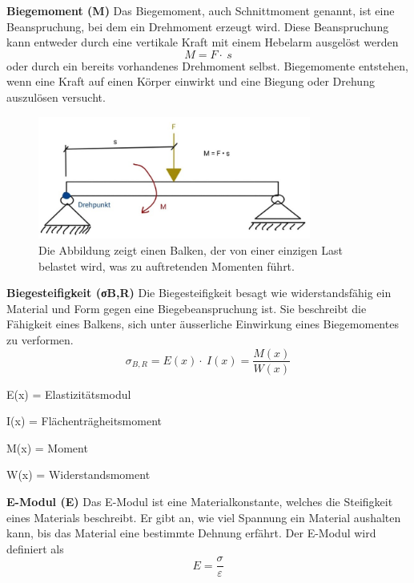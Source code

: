 \textbf{Biegemoment (M)}
Das Biegemoment, auch Schnittmoment genannt, ist eine Beanspruchung, bei dem ein Drehmoment erzeugt wird.
Diese Beanspruchung kann entweder durch eine vertikale Kraft mit einem Hebelarm ausgelöst werden
\begin{equation}
	M=
	F\cdot\ s
\end{equation}
oder durch ein bereits vorhandenes Drehmoment selbst.
Biegemomente entstehen, wenn eine Kraft auf einen Körper einwirkt und eine Biegung oder Drehung auszulösen versucht.
\begin{figure} [h]
	\centering
	\includegraphics[width=0.8\textwidth]{papers/balken/images/teil1/Biegemoment.jpg}
	\caption{Die Abbildung zeigt einen Balken, der von einer einzigen Last belastet wird, was zu auftretenden Momenten führt.}
	\label{fig:Die Abbildung zeigt einen Balken, der von einer einzigen Last belastet wird, was zu auftretenden Momenten führt.}
\end{figure}

\textbf{Biegesteifigkeit (σB,R)}
Die Biegesteifigkeit besagt wie widerstandsfähig ein Material und Form gegen eine Biegebeanspruchung ist.
Sie beschreibt die Fähigkeit eines Balkens, sich unter äusserliche Einwirkung eines Biegemomentes zu verformen.
\begin{equation}
\sigma_{B,R}=E
\left(x\right)\cdot\ I\left(x\right)=
\frac{M(x)}{W(x)}
\end{equation}

E(x) = Elastizitätsmodul

I(x) = Flächenträgheitsmoment

M(x) = Moment 

W(x) = Widerstandsmoment

\textbf{E-Modul (E)}
Das E-Modul ist eine Materialkonstante, welches die Steifigkeit eines Materials beschreibt.
Er gibt an, wie viel Spannung ein Material aushalten kann, bis das Material eine bestimmte Dehnung erfährt.
Der E-Modul wird definiert als
\begin{equation}
E=
\frac{\sigma}{\varepsilon}
\end{equation}

